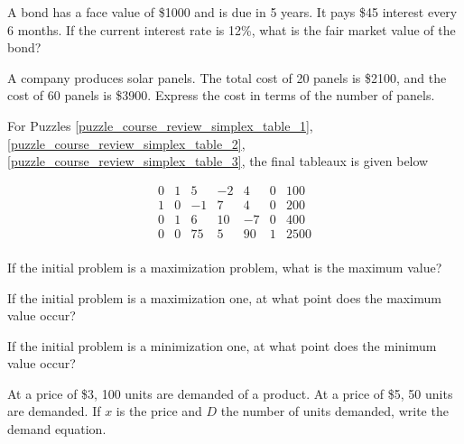 \begin{puzzle}
    A bond has a face value of \$1000 and is due in 5 years. It pays \$45 interest every 6 months. If the current interest rate is 12\%, what is the fair market value of the bond?
\end{puzzle}

\begin{puzzle}
    A company produces solar panels. The total cost of 20 panels is \$2100, and the cost of 60 panels is \$3900. Express the cost in terms of the number of panels.
\end{puzzle}

For Puzzles \ref{puzzle_course_review_simplex_table_1}, \ref{puzzle_course_review_simplex_table_2}, \ref{puzzle_course_review_simplex_table_3}, the final tableaux is given below

\[
    \begin{array}{cccccc|r}
        0 & 1 & 5  & -2 & 4  & 0 & 100  \\
        1 & 0 & -1 & 7  & 4  & 0 & 200  \\
        0 & 1 & 6  & 10 & -7 & 0 & 400  \\
        \hline
        0 & 0 & 75 & 5  & 90 & 1 & 2500 \\
    \end{array}
\]

\begin{puzzle}\label{puzzle_course_review_simplex_table_1}
    If the initial problem is a maximization problem, what is the maximum value?
\end{puzzle}

\begin{puzzle}\label{puzzle_course_review_simplex_table_2}
    If the initial problem is a maximization one, at what point does the maximum value occur?
\end{puzzle}

\begin{puzzle}\label{puzzle_course_review_simplex_table_3}
    If the initial problem is a minimization one, at what point does the minimum value occur?
\end{puzzle}

\begin{puzzle}
    At a price of \$3, 100 units are demanded of a product. At a price of \$5, 50 units are demanded. If \(x\) is the price and \(D\) the number of units demanded, write the demand equation.
\end{puzzle}

